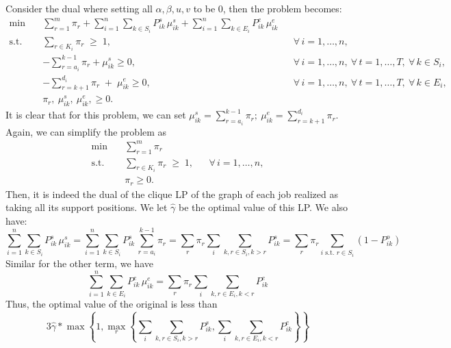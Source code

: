 \documentclass{article}
\begin{document}
Consider the dual where setting all $\alpha,\beta, u,v$ to be $0$, then the problem becomes:
\[
\begin{aligned}
\min\quad 
& \sum_{r=1}^{m} \pi_r
  + \sum_{i=1}^{n}\sum_{k\in S_i} P^s_{ik}\,\mu^s_{ik}
  + \sum_{i=1}^{n}\sum_{k\in E_i} P^e_{ik}\,\mu^e_{ik}
 \\[4pt]
\text{s.t.}\quad 
& \sum_{r\in K_i} \pi_r \;\ge\; 1,
&& \forall\, i=1,\ldots,n,\\[4pt]
&-\sum_{r=a_i}^{k-1} \pi_r +\mu^s_{ik}\geq 0,
&& \forall\, i=1,\ldots,n,\ \forall\, t=1,\ldots,T,\ \forall\, k\in S_i, \\[4pt]
& -\sum_{r=k+1}^{d_i} \pi_r \;+\; \mu^e_{ik} \geq 0,
&& \forall\, i=1,\ldots,n,\ \forall\, t=1,\ldots,T,\ \forall\, k\in E_i, \\[6pt]
& \pi_r,\ \mu^s_{ik},\ \mu^e_{ik},\geq 0.
&&
\end{aligned}
\]
It is clear that for this problem, we can set $
\mu^s_{ik}=\sum_{r=a_i}^{k-1} \pi_r;~ 
\mu^e_{ik} = \sum_{r=k+1}^{d_i} \pi_r$.
Again, we can simplify the problem as 
\[
\begin{aligned}
\min\quad 
& \sum_{r=1}^{m} \pi_r
 \\[4pt]
\text{s.t.}\quad 
& \sum_{r\in K_i} \pi_r \;\ge\; 1,
&& \forall\, i=1,\ldots,n,\\[4pt]
& \pi_r\geq 0.
&&
\end{aligned}
\]
Then, it is indeed the dual of the clique LP of the graph of each job realized as taking all its support positions.
We let $\hat{\gamma}$ be the optimal value of this LP.
We also have:
\[\sum_{i=1}^{n}\sum_{k\in S_i} P^s_{ik}\,\mu^s_{ik} = \sum_{i=1}^{n}\sum_{k\in S_i} P^s_{ik}\, \sum_{r=a_i}^{k-1}\pi_r = \sum_{r}\pi_r\sum_{i}\sum_{k,r\in S_i, k>r}P_{ik}^s=\sum_r \pi_r \sum_{i\text{ s.t. }r\in S_i} (1-P_{ik}^o)\]
Similar for the other term, we have 
\[\sum_{i=1}^{n}\sum_{k\in E_i} P^e_{ik}\,\mu^e_{ik} = \sum_{r}\pi_r\sum_{i}\sum_{k,r\in E_i, k<r}P_{ik}^e\]
Thus, the optimal value of the original is less than 
\[3\hat{\gamma}*\max\left\{1,\max_r\left\{\sum_{i}\sum_{k,r\in S_i, k>r}P_{ik}^s, \sum_{i}\sum_{k,r\in E_i, k<r}P_{ik}^e\right\}\right\}\]
\end{document}
